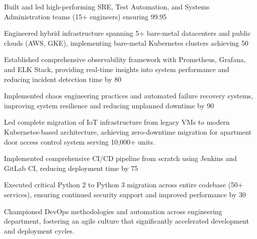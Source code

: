 \documentclass[11pt,a4paper,sans]{moderncv}
\begin{document}
{{{{{{  
  \item{ Built and led high-performing SRE, Test Automation, and Systems Administration teams (15+ engineers) ensuring 99.95%
  
  \item{ Engineered hybrid infrastructure spanning 5+ bare-metal datacenters and public clouds (AWS, GKE), implementing bare-metal Kubernetes clusters achieving 50%
  
  \item{ Established comprehensive observability framework with Prometheus, Grafana, and ELK Stack, providing real-time insights into system performance and reducing incident detection time by 80%
  
  \item{ Implemented chaos engineering practices and automated failure recovery systems, improving system resilience and reducing unplanned downtime by 90%
  



  
  \item{ Led complete migration of IoT infrastructure from legacy VMs to modern Kubernetes-based architecture, achieving zero-downtime migration for apartment door access control system serving 10,000+ units. }
  
  \item{ Implemented comprehensive CI/CD pipeline from scratch using Jenkins and GitLab CI, reducing deployment time by 75%
  
  \item{ Executed critical Python 2 to Python 3 migration across entire codebase (50+ services), ensuring continued security support and improved performance by 30%
  



  
  \item{ Championed DevOps methodologies and automation across engineering department, fostering an agile culture that significantly accelerated development and deployment cycles. }
  
}}}}}}}}}}}}
\end{document}
